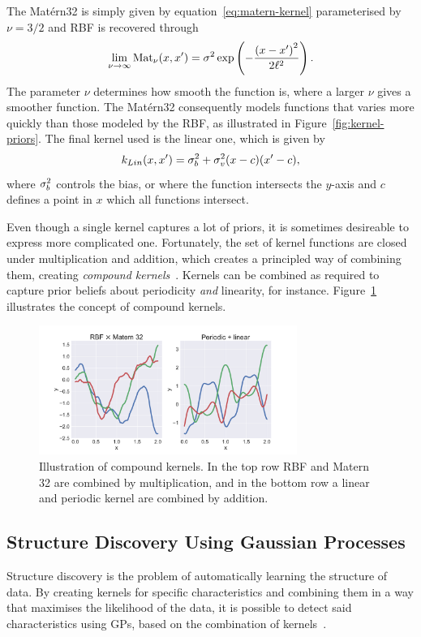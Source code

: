 The Matérn32 is simply given by equation~\ref{eq:matern-kernel}
parameterised by $\nu = 3/2$ and RBF is recovered through
\begin{equation}
  \lim_{\nu \to \infty} \text{Mat}_\nu(x, x') = 
\sigma^2 \exp \left(-\frac{{(x-x')}^2}{2\ell^2}\right).
\end{equation}
The parameter $\nu$ determines how smooth the function is, where a larger $\nu$ gives a
smoother function. The Matérn32 consequently models functions that
varies more quickly than those modeled by the RBF, as illustrated in
Figure~\ref{fig:kernel-priors}. The final kernel
used is the linear one, which is given by 
\begin{equation}
  k_{Lin}(x, x') = \sigma^2_b + \sigma^2_v(x-c)(x'-c),
\end{equation}
where $\sigma^2_b$ controls the bias, or where the function intersects the
$y$-axis and $c$ defines a point in $x$ which all functions intersect.

Even though a single kernel captures a lot of priors, it is sometimes
desireable to express more complicated one. Fortunately,
the set of kernel functions are closed under multiplication and addition, which
creates a principled way of combining them, creating \textit{compound
  kernels}~\cite{duvenaud2013structure}. Kernels can be combined as
required to capture prior beliefs about periodicity \textit{and}
linearity, for instance. Figure~\ref{fig:compound-kernels} illustrates
the concept of compound kernels.
\begin{figure}
  \centering
  \includegraphics[width=0.75\textwidth]{figures/compound-kernels}
  \caption{Illustration of compound kernels. In the top row RBF
    and Matern 32 are combined by multiplication, and in the bottom
    row a linear and periodic kernel are combined by addition.}\label{fig:compound-kernels}
\end{figure}

\subsection{Structure Discovery Using Gaussian Processes}
Structure discovery is the problem of automatically learning the
structure of data. By creating kernels for specific characteristics
and combining them in a way that maximises the likelihood of the data, it
is possible to detect said characteristics using GPs, based on the combination
of kernels~\cite{duvenaud2013structure}.

